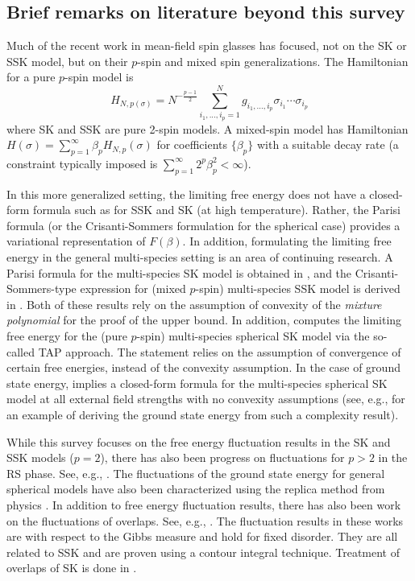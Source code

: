 \documentclass[11pt]{article}
\numberwithin{equation}{section}
\def \b {\beta}
\def \s {\sigma}
\theoremstyle{remark}
\begin{document}
\subsection{Brief remarks on literature beyond this survey}\label{sec:beyondscope}

Much of the recent work in mean-field spin glasses has focused, not on the SK or SSK model, but on their $p$-spin and mixed spin generalizations.  The Hamiltonian for a pure $p$-spin model is
\[H_{N,p(\s)}=N^{-\frac{p-1}{2}}\sum_{i_1,...,i_p=1}^Ng_{i_1,...,i_p}\s_{i_1}\cdots\s_{i_p}\]
where SK and SSK are pure 2-spin models.  A mixed-spin model has Hamiltonian $H(\s)=\sum_{p=1}^\infty \b_pH_{N,p}(\s)$ for coefficients $\{\b_p\}$ with a suitable decay rate (a constraint typically imposed is $\sum_{p=1}^\infty2^p\b_p^2< \infty$).

In this more generalized setting, the limiting free energy does not have a closed-form formula such as for SSK and SK (at high temperature). Rather, the Parisi formula (or the Crisanti-Sommers formulation for the spherical case) provides a variational representation of $F(\b)$. In addition, formulating the limiting free energy in the general multi-species setting is an area of continuing research. A Parisi formula for the multi-species SK model is obtained in \cites{Barra15, Panchenko15}, and the Crisanti-Sommers-type expression for (mixed $p$-spin) multi-species SSK model is derived in \cite{BatesSohn22}. Both of these results rely on the assumption of convexity of the \textit{mixture polynomial} for the proof of the upper bound. In addition, \cite{Subag23} computes the limiting free energy for the (pure $p$-spin) multi-species spherical SK model via the so-called TAP approach. The statement relies on the assumption of convergence of certain free energies, instead of the convexity assumption. In the case of ground state energy, \cite[Theorem 1.5]{HuangSellke_topologicaltrivialization} implies a closed-form formula for the multi-species spherical SK model at all external field strengths with no convexity assumptions (see, e.g.\@, \cite{SubagZeitouni_2017} for an example of deriving the ground state energy from such a complexity result). 

While this survey focuses on the free energy fluctuation results in the SK and SSK models ($p=2$), there has also been progress on fluctuations for $p>2$ in the RS phase. See, e.g., \cite{Bovier_rem, Bovier_twoscales, JLM_tensorPCA}.  The fluctuations of the ground state energy for general spherical models have also been characterized using the replica method from physics \cite{Fyodorov_groundstateLDP}. In addition to free energy fluctuation results, there has also been work on the fluctuations of overlaps.  See, e.g., \cite{Baiketal21,CW21,landon2020fluctuations,LS22,nguyen2018central}. The fluctuation results in these works are with respect to the Gibbs measure and hold for fixed disorder. They are all related to SSK and are proven using a contour integral technique. Treatment of overlaps of SK is done in \cite[Section 1.10]{Talagrandvol1}.
\end{document}
